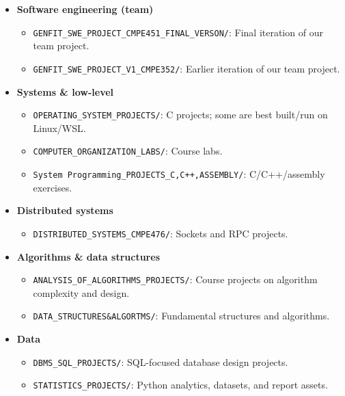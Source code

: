 \documentclass[11pt]{article}
\begin{document}
\begin{itemize}
    \item \textbf{Software engineering (team)}
    \begin{itemize}
        \item \texttt{GENFIT\_SWE\_PROJECT\_CMPE451\_FINAL\_VERSON/}: Final iteration of our team project.
        \item \texttt{GENFIT\_SWE\_PROJECT\_V1\_CMPE352/}: Earlier iteration of our team project.
    \end{itemize}
    
    \item \textbf{Systems \& low-level}
    \begin{itemize}
        \item \texttt{OPERATING\_SYSTEM\_PROJECTS/}: C projects; some are best built/run on Linux/WSL.
        \item \texttt{COMPUTER\_ORGANIZATION\_LABS/}: Course labs.
        \item \texttt{System Programming\_PROJECTS\_C,C++,ASSEMBLY/}: C/C++/assembly exercises.
    \end{itemize}

    \item \textbf{Distributed systems}
    \begin{itemize}
        \item \texttt{DISTRIBUTED\_SYSTEMS\_CMPE476/}: Sockets and RPC projects.
    \end{itemize}
    
    \item \textbf{Algorithms \& data structures}
    \begin{itemize}
        \item \texttt{ANALYSIS\_OF\_ALGORITHMS\_PROJECTS/}: Course projects on algorithm complexity and design.
        \item \texttt{DATA\_STRUCTURES\&ALGORTMS/}: Fundamental structures and algorithms.
    \end{itemize}
    
    \item \textbf{Data}
    \begin{itemize}
        \item \texttt{DBMS\_SQL\_PROJECTS/}: SQL-focused database design projects.
        \item \texttt{STATISTICS\_PROJECTS/}: Python analytics, datasets, and report assets.
    \end{itemize}


\end{itemize}
\end{document}
